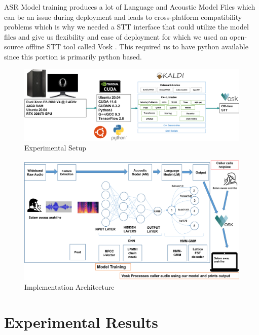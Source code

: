 ASR Model training produces a lot of Language and Acoustic Model Files which can be an issue during deployment and leads to cross-platform compatibility problems which is why we needed a STT interface that could utilize the model files and give us flexibility and ease of deployment for which we used an open-source offline STT tool called Vosk \cite{alphacep_vosk_2022}. This required us to have python available since this portion is primarily python based.

\newpage
\begin{landscape}

\begin{figure}[htbp]
    \centering
    \includegraphics[width=1.5\textwidth]{img/Implementation.png}
    \caption{Experimental Setup}
    \label{fig:experimental-setup}
\end{figure}
\newpage
\begin{figure}[htbp]
    \includegraphics[width=1.5\textwidth]{img/Implement2.png}
    \caption{Implementation Architecture}
    \label{fig:implementation-architecture}
\end{figure}

\newpage
\end{landscape}

\section{Experimental Results}

